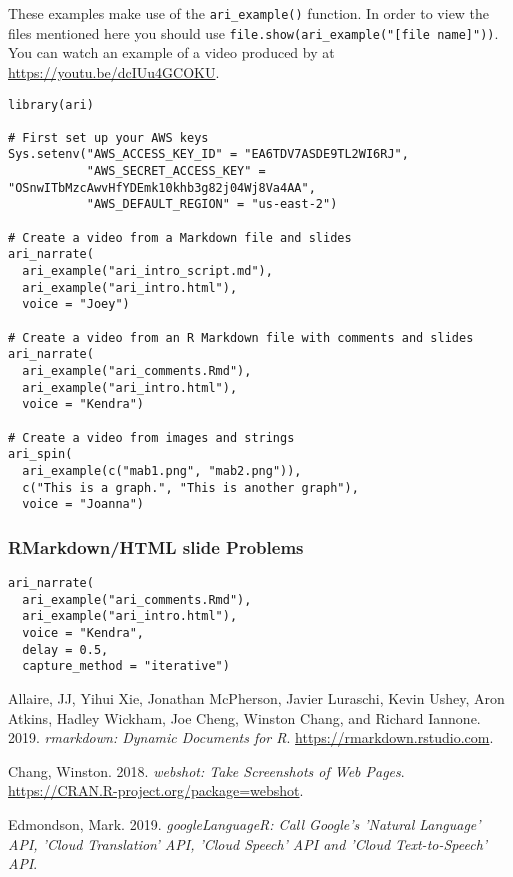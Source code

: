 These examples make use of the \texttt{ari\_example()} function. In
order to view the files mentioned here you should use
\texttt{file.show(ari\_example("{[}file\ name{]}"))}. You can watch an
example of a video produced by  at
\url{https://youtu.be/dcIUu4GCOKU}.

\begin{verbatim}
library(ari)

# First set up your AWS keys
Sys.setenv("AWS_ACCESS_KEY_ID" = "EA6TDV7ASDE9TL2WI6RJ",
           "AWS_SECRET_ACCESS_KEY" = "OSnwITbMzcAwvHfYDEmk10khb3g82j04Wj8Va4AA",
           "AWS_DEFAULT_REGION" = "us-east-2")

# Create a video from a Markdown file and slides
ari_narrate(
  ari_example("ari_intro_script.md"),
  ari_example("ari_intro.html"),
  voice = "Joey")

# Create a video from an R Markdown file with comments and slides
ari_narrate(
  ari_example("ari_comments.Rmd"),
  ari_example("ari_intro.html"),
  voice = "Kendra")

# Create a video from images and strings
ari_spin(
  ari_example(c("mab1.png", "mab2.png")),
  c("This is a graph.", "This is another graph"),
  voice = "Joanna")
\end{verbatim}

\hypertarget{rmarkdownhtml-slide-problems}{%
\subsubsection{RMarkdown/HTML slide
Problems}\label{rmarkdownhtml-slide-problems}}

\begin{verbatim}
ari_narrate(
  ari_example("ari_comments.Rmd"),
  ari_example("ari_intro.html"),
  voice = "Kendra",
  delay = 0.5,
  capture_method = "iterative")
\end{verbatim}



\hypertarget{refs}{}
\leavevmode\hypertarget{ref-rmarkdown}{}%
Allaire, JJ, Yihui Xie, Jonathan McPherson, Javier Luraschi, Kevin
Ushey, Aron Atkins, Hadley Wickham, Joe Cheng, Winston Chang, and
Richard Iannone. 2019. \emph{rmarkdown: Dynamic Documents for R}.
\url{https://rmarkdown.rstudio.com}.

\leavevmode\hypertarget{ref-webshot}{}%
Chang, Winston. 2018. \emph{webshot: Take Screenshots of Web Pages}.
\url{https://CRAN.R-project.org/package=webshot}.

\leavevmode\hypertarget{ref-googleLanguageR}{}%
Edmondson, Mark. 2019. \emph{googleLanguageR: Call Google's 'Natural
Language' API, 'Cloud Translation' API, 'Cloud Speech' API and 'Cloud
Text-to-Speech' API}.

